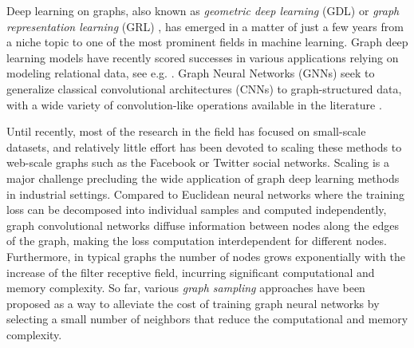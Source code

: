 \documentclass{article}
\begin{document}
Deep learning on graphs, also known as {\em geometric deep learning} (GDL) \cite{7974879} or {\em graph representation learning} (GRL) \cite{hamilton2017representation,battaglia2018relational,zhang2018deep}, has emerged in a matter of just a few years from a niche topic to one of the most prominent fields in machine learning. 
Graph deep learning models have recently scored successes in various applications relying on modeling relational data, see e.g. \cite{zhang2018link,qi2018learning,Monti2016GeometricDL,choma2018graph,NIPS2015_5954,pmlr-v70-gilmer17a,parisot2018disease,zitnik2018modeling,veselkov2019hyperfoods,gainza2019deciphering,rossi2019ncrna,monti2019fake}. Graph Neural Networks (GNNs) seek to generalize classical convolutional architectures (CNNs) to graph-structured data, 
with a wide variety of convolution-like operations available in the literature \cite{scarselli2008graph,defferrard2016convolutional,DBLP:conf/nips/AtwoodT16,DBLP:conf/icml/NiepertAK16,DBLP:conf/cvpr/SimonovskyK17,Monti2016GeometricDL,kipf2016semi,pmlr-v97-wu19e,DBLP:conf/iclr/VelickovicCCRLB18,GraphSAGE}. 



Until recently, most of the research in the field has focused on small-scale datasets,  and relatively little effort has  been devoted to scaling these methods to web-scale graphs such as the Facebook or Twitter social networks.
Scaling is a major challenge precluding the wide application of graph deep learning methods in industrial settings. Compared to Euclidean neural networks where the training loss can be decomposed into individual samples and computed independently, graph convolutional networks diffuse information between nodes along the edges of the graph, making the loss computation interdependent for different nodes. 
Furthermore, in typical graphs the number of nodes grows exponentially with the increase of the filter receptive field, incurring significant computational and memory complexity. 
So far, various 
{\em graph sampling} approaches  \cite{GraphSAGE, pinsage, fastgcn, adaptive-sampling, stochastic-training,Chiang:2019:CEA:3292500.3330925,DBLP:journals/corr/abs-1907-04931,zou2019layer} have been proposed as a way to alleviate the cost of training graph neural networks by selecting a small number of neighbors that reduce the computational and memory complexity. 
\end{document}
